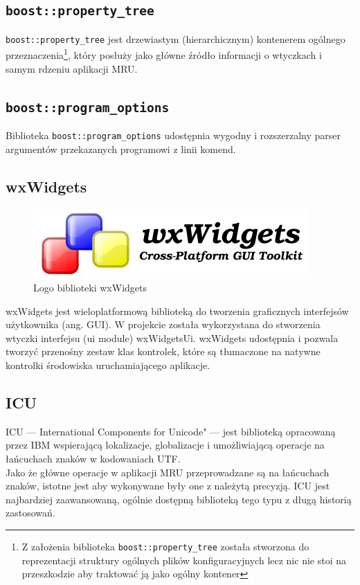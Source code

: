\subsection{\texttt{boost::property\_tree}}
\par
\texttt{boost::property\_tree} jest drzewiastym (hierarchicznym) kontenerem ogólnego przeznaczenia\footnote{Z założenia biblioteka \texttt{boost::property\_tree} została stworzona do reprezentacji struktury ogólnych plików konfiguracyjnych lecz nic nie stoi na przeszkodzie aby traktować ją jako ogólny kontener}, który posłuży jako główne źródło informacji o wtyczkach i samym rdzeniu aplikacji MRU.

\subsection{\texttt{boost::program\_options}}
\par
Biblioteka \texttt{boost::program\_options} udostępnia wygodny i rozszerzalny parser argumentów przekazanych programowi z linii komend.

\subsection{wxWidgets}
\begin{figure}
\begin{center}
\includegraphics[scale=0.50]{img/wxwidgets_logo.png}
\end{center}
\caption{Logo biblioteki wxWidgets}
\end{figure}

\par
wxWidgets jest wieloplatformową biblioteką do tworzenia graficznych interfejsów użytkownika (ang. GUI). W projekcie została wykorzystana do stworzenia wtyczki interfejsu (ui module) wxWidgetsUi. wxWidgets udostępnia i pozwala tworzyć przenośny zestaw klas kontrolek, które są tłumaczone na natywne kontrolki środowiska uruchamiającego aplikacje.

\subsection{ICU}
\par
ICU --- International Components for Unicode" --- jest biblioteką opracowaną przez IBM wspierającą lokalizacje, globalizacje i umożliwiającą operacje na łańcuchach znaków w kodowaniach UTF.\\
Jako że główne operacje w aplikacji MRU przeprowadzane są na łańcuchach znaków, istotne jest aby wykonywane były one z należytą precyzją. ICU jest najbardziej zaawansowaną, ogólnie dostępną biblioteką tego typu z długą historią zastosowań.

